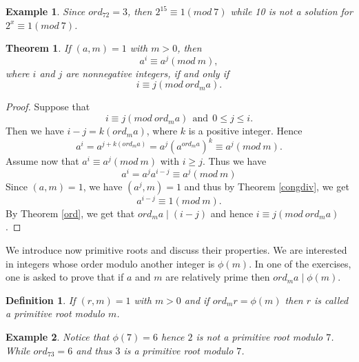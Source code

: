 \documentclass[12pt,letterpaper]{book}
\newtheorem{theorem}{Theorem}
\newtheorem{def1}{Definition}
\newtheorem{example}{Example}
\begin{document}
\begin{example}
Since $ord_72=3$, then $2^{15}\equiv 1(mod \ 7)$ while 10 is not a
solution for $2^x\equiv 1 (mod \ 7)$.
\end{example}

\begin{theorem}\label{modord}
If $(a,m)=1$ with $m>0$, then
\begin{equation*}
a^i\equiv a^j(mod \ m),
\end{equation*}
where $i$ and $j$ are nonnegative integers, if and only if
\begin{equation*}
i\equiv j(mod \ ord_ma).
\end{equation*}
\end{theorem}

\begin{proof}
Suppose that
\begin{equation*}
 i\equiv j(mod \ ord_ma)\ \  \mbox{and}\ \  0\leq j\leq i.
\end{equation*}
 Then we
have $i-j=k(ord_ma)$, where $k$ is a positive integer.  Hence
\begin{equation*}
a^i=a^{j+k(ord_ma)}=a^j(a^{ord_ma})^k\equiv a^j (mod \ m).
\end{equation*}
Assume now that $a^i\equiv a^j(mod \ m)$ with $i\geq j$.  Thus we
have
\begin{equation*}
a^i=a^ja^{i-j}\equiv a^j(mod \ m)
\end{equation*}
Since $(a,m)=1$, we have $(a^j,m)=1$ and thus by Theorem \ref{congdiv}, we get
\begin{equation*}
a^{i-j}\equiv 1(mod \ m).
\end{equation*}
By Theorem \ref{ord}, we get that $ord_ma \mid (i-j)$ and hence $i\equiv
j(mod \ ord_ma)$.

\end{proof}
We introduce now primitive roots and discuss their properties.  We
are interested in integers whose order modulo another integer is
$\phi(m)$. In one of the exercises, one is asked to prove that if $a
$ and $m$ are relatively prime then $ord_ma \mid \phi(m)$.
\begin{def1}
If $(r,m)=1$ with $m>0$ and if $ord_mr=\phi(m)$ then $r$ is called a
primitive root modulo $m$.
\end{def1}

\begin{example}
Notice that $\phi(7)=6$ hence $2$ is not a primitive root modulo
$7$. While $ord_73=6$ and thus $3$ is a primitive root modulo $7$.
\end{example}
\end{document}
